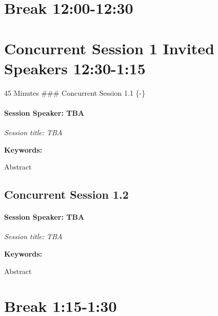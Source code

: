 \documentclass[
]{book}
\begin{document}
\hypertarget{break-1200-1230}{%
\section*{Break \textbar{} 12:00-12:30}\label{break-1200-1230}}

\hypertarget{concurrent-session-1-invited-speakers-1230-115}{%
\section*{Concurrent Session 1 \textbar{} Invited Speakers \textbar{} 12:30-1:15}\label{concurrent-session-1-invited-speakers-1230-115}}

45 Minutes
\#\#\# Concurrent Session 1.1 \{-\}

\begin{speaker}
\hypertarget{session-speaker-tba}{%
\paragraph{\texorpdfstring{Session Speaker:
\textbf{TBA}}{Session Speaker: TBA}}\label{session-speaker-tba}}

\emph{Session title: TBA}

\textbf{Keywords:}

Abstract
\end{speaker}

\hypertarget{concurrent-session-1.2}{%
\subsection*{Concurrent Session 1.2}\label{concurrent-session-1.2}}

\begin{speaker}
\hypertarget{session-speaker-tba}{%
\paragraph{\texorpdfstring{Session Speaker:
\textbf{TBA}}{Session Speaker: TBA}}\label{session-speaker-tba}}

\emph{Session title: TBA}

\textbf{Keywords:}

Abstract
\end{speaker}

\hypertarget{break-115-130}{%
\section*{Break \textbar{} 1:15-1:30}\label{break-115-130}}
\end{document}
